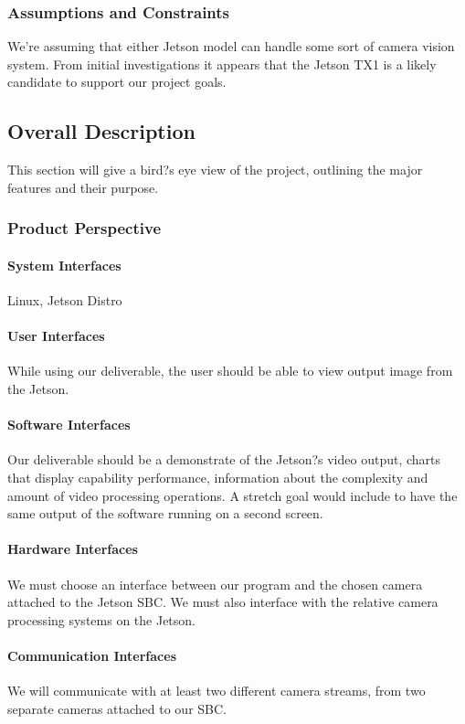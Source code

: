 \subsubsection{Assumptions and Constraints}
We're assuming that either Jetson model can handle some sort of camera vision system. From initial investigations it appears that the Jetson TX1 is a likely candidate to support our project goals.

\subsection{Overall Description}
This section will give a bird?s eye view of the project, outlining the major features and their purpose.\\
\subsubsection{Product Perspective}
  \paragraph{System Interfaces}
  Linux, Jetson Distro
  \paragraph{User Interfaces}
  While using our deliverable, the user should be able to view output image from the Jetson.
  \paragraph{Software Interfaces}
  Our deliverable should be a demonstrate of the Jetson?s video output, charts that display capability performance, information about the complexity and amount of video processing operations. A stretch goal would include to have the same output of the software running on a second screen.
  \paragraph{Hardware Interfaces}
  We must choose an interface between our program and the chosen camera attached to the Jetson SBC. We must also interface with the relative camera processing systems on the Jetson.
  \paragraph{Communication Interfaces}
  We will communicate with at least two different camera streams, from two separate cameras attached to our SBC.\\
  
